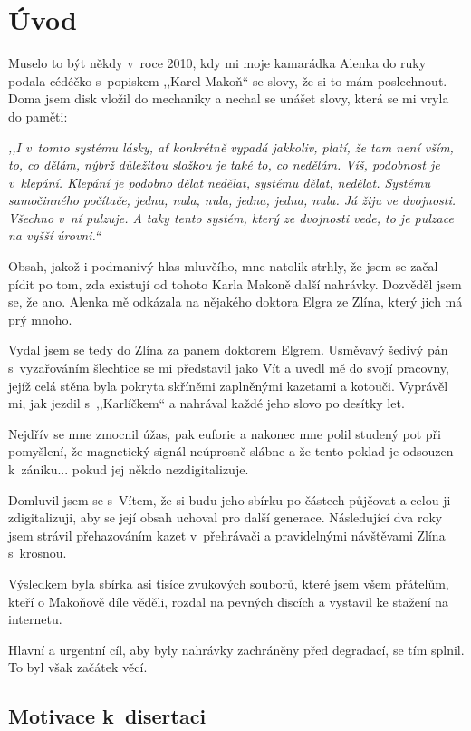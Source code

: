 \chapter{Úvod}
\label{kap:uvod}

Muselo to být někdy v~roce 2010, kdy mi moje kamarádka Alenka do ruky podala
cédéčko s~popiskem ,,Karel Makoň`` se slovy, že si to mám poslechnout. Doma jsem
disk vložil do mechaniky a nechal se unášet slovy, která se mi vryla do paměti:

{\em ,,I v~tomto systému lásky, ať konkrétně vypadá jakkoliv, platí, že tam není
vším, to, co dělám, nýbrž důležitou složkou je také to, co nedělám. Víš,
podobnost je v~klepání. Klepání je podobno dělat nedělat, systému dělat,
nedělat. Systému samočinného počítače, jedna, nula, nula, jedna, jedna, nula. Já
žiju ve dvojnosti. Všechno v~ní pulzuje. A taky tento systém, který ze dvojnosti
vede, to je pulzace na vyšší úrovni.``}

Obsah, jakož i podmanivý hlas mluvčího, mne natolik strhly, že jsem se začal
pídit po tom, zda existují od tohoto Karla Makoně další nahrávky. Dozvěděl jsem
se, že ano. Alenka mě odkázala na nějakého doktora Elgra ze Zlína, který jich má
prý mnoho.

Vydal jsem se tedy do Zlína za panem doktorem Elgrem. Usměvavý šedivý pán
s~vyzařováním šlechtice se mi představil jako Vít a uvedl mě do svojí pracovny, jejíž celá stěna byla
pokryta skříněmi zaplněnými kazetami a kotouči. Vyprávěl mi, jak jezdil
s~,,Karlíčkem`` a nahrával každé jeho slovo po desítky let.

Nejdřív se mne zmocnil úžas, pak euforie a nakonec mne polil studený pot při
pomyšlení, že magnetický signál neúprosně slábne a že tento poklad je odsouzen
k~zániku... pokud jej někdo nezdigitalizuje.

Domluvil jsem se s~Vítem, že si budu jeho sbírku po částech půjčovat a celou ji
zdigitalizuji, aby se její obsah uchoval pro další generace. Následující dva
roky jsem strávil přehazováním kazet v~přehrávači a pravidelnými návštěvami
Zlína s~krosnou.

Výsledkem byla sbírka asi tisíce zvukových souborů, které jsem všem přátelům,
kteří o Makoňově díle věděli, rozdal na pevných discích a vystavil ke stažení na
internetu.

Hlavní a urgentní cíl, aby byly nahrávky zachráněny před degradací, se tím
splnil. To byl však začátek věcí.

\section{Motivace k~disertaci}

